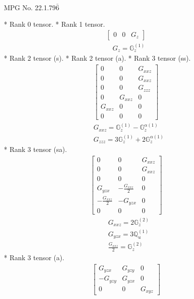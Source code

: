 \documentclass[fleqn,8pt,landscape]{jsarticle}
\begin{document}
\setcounter{MaxMatrixCols}{32}

\renewcommand{\tablename}{Table~}
\renewcommand{\figurename}{Figure~}
\begin{center}
\LARGE
MPG No. 22.1.79\quad$\bar{6}$
\end{center}
* Rank 0 tensor.
* Rank 1 tensor.
\begin{align*}
\begin{bmatrix} 0 & 0 & G_{z} \end{bmatrix}
\end{align*}
\begin{align*}
& G_{z} = \mathbb{G}_{z}^{(1)}
\end{align*}
* Rank 2 tensor (s).
* Rank 2 tensor (a).
* Rank 3 tensor (ss).
\begin{align*}
\begin{bmatrix} 0 & 0 & G_{xxz} \\ 0 & 0 & G_{xxz} \\ 0 & 0 & G_{zzz} \\ 0 & G_{xxz} & 0 \\ G_{xxz} & 0 & 0 \\ 0 & 0 & 0 \end{bmatrix}
\end{align*}
\begin{align*}
& G_{xxz} = \mathbb{G}_{z}^{(1)} - \mathbb{G}_{z}^{\alpha(1)} \\
& G_{zzz} = 3 \mathbb{G}_{z}^{(1)} + 2 \mathbb{G}_{z}^{\alpha(1)}
\end{align*}
* Rank 3 tensor (sa).
\begin{align*}
\begin{bmatrix} 0 & 0 & G_{xxz} \\ 0 & 0 & G_{xxz} \\ 0 & 0 & 0 \\ G_{yzx} & - \frac{G_{xxz}}{2} & 0 \\ - \frac{G_{xxz}}{2} & - G_{yzx} & 0 \\ 0 & 0 & 0 \end{bmatrix}
\end{align*}
\begin{align*}
& G_{xxz} = 2 \mathbb{G}_{z}^{(2)} \\
& G_{yzx} = 3 \mathbb{Q}_{u}^{(1)} \\
& \frac{G_{xxz}}{2} = \mathbb{G}_{z}^{(2)}
\end{align*}
* Rank 3 tensor (a).
\begin{align*}
\begin{bmatrix} G_{yzx} & G_{yzy} & 0 \\ - G_{yzy} & G_{yzx} & 0 \\ 0 & 0 & G_{xyz} \end{bmatrix}
\end{align*}
\end{document}
